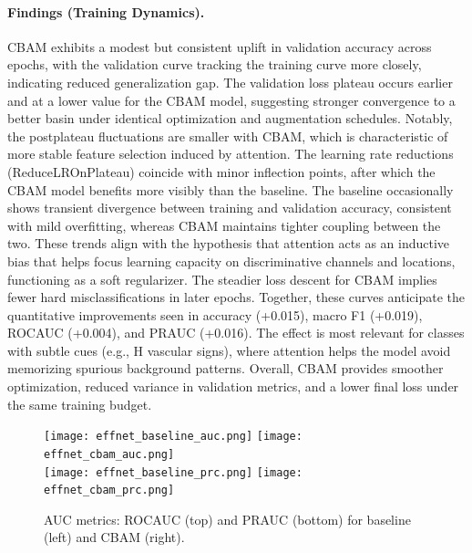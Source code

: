 \paragraph{Findings (Training Dynamics).}
CBAM exhibits a modest but consistent uplift in validation accuracy across epochs, with the validation curve tracking the training curve more closely, indicating reduced generalization gap. The validation loss plateau occurs earlier and at a lower value for the CBAM model, suggesting stronger convergence to a better basin under identical optimization and augmentation schedules. Notably, the post\textendash plateau fluctuations are smaller with CBAM, which is characteristic of more stable feature selection induced by attention. The learning rate reductions (ReduceLROnPlateau) coincide with minor inflection points, after which the CBAM model benefits more visibly than the baseline. The baseline occasionally shows transient divergence between training and validation accuracy, consistent with mild overfitting, whereas CBAM maintains tighter coupling between the two. These trends align with the hypothesis that attention acts as an inductive bias that helps focus learning capacity on discriminative channels and locations, functioning as a soft regularizer. The steadier loss descent for CBAM implies fewer hard misclassifications in later epochs. Together, these curves anticipate the quantitative improvements seen in accuracy (+0.015), macro F1 (+0.019), ROC\textendash AUC (+0.004), and PR\textendash AUC (+0.016). The effect is most relevant for classes with subtle cues (e.g., H vascular signs), where attention helps the model avoid memorizing spurious background patterns. Overall, CBAM provides smoother optimization, reduced variance in validation metrics, and a lower final loss under the same training budget.

\begin{figure}[H]
  \centering
  \texttt{[image: effnet\_baseline\_auc.png]}
  \texttt{[image: effnet\_cbam\_auc.png]}\\
  \texttt{[image: effnet\_baseline\_prc.png]}
  \texttt{[image: effnet\_cbam\_prc.png]}
  \caption{AUC metrics: ROC\textendash AUC (top) and PR\textendash AUC (bottom) for baseline (left) and CBAM (right).}
  \label{fig:auc_curves}
\end{figure}


